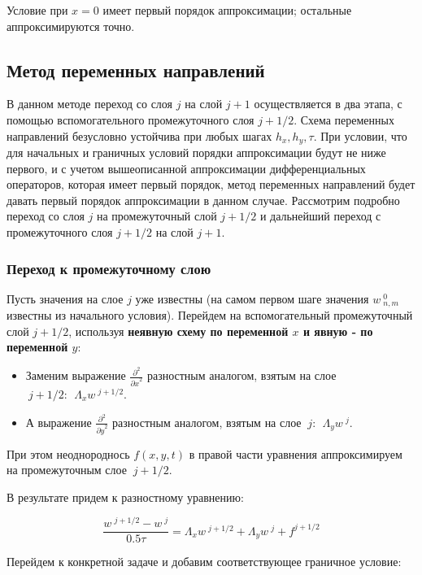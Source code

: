 \documentclass[a4paper]{article}
\begin{document}
Условие при $ x=0 $ имеет первый порядок аппроксимации; остальные аппроксимируются точно.

\subsection{Метод переменных направлений}
В данном методе переход со слоя $j$ на слой $j+1$ осуществляется в два этапа, с помощью вспомогательного промежуточного слоя $j+1/2$. Схема переменных направлений безусловно устойчива при любых шагах $h_x, h_y, \tau$. При условии, что для начальных и граничных условий порядки аппроксимации будут не ниже первого, и с учетом вышеописанной аппроксимации дифференциальных операторов, которая имеет первый порядок, метод переменных направлений будет давать первый порядок аппроксимации в данном случае. Рассмотрим подробно переход со слоя $j$ на промежуточный слой $j+1/2$ и дальнейший переход с промежуточного слоя $j+1/2$ на слой $j+1$.

\subsubsection{Переход к промежуточному слою}
Пусть значения на слое $j$ уже известны (на самом первом шаге значения $w~^{0}_{n,m}$ известны из начального условия). Перейдем на вспомогательный промежуточный слой $j + 1/2$, используя \textbf{неявную схему по переменной $x$ и явную - по переменной $y$}:

\begin{itemize}
\item Заменим выражение $\frac{\partial^2 }{{\partial x}^2}$ разностным аналогом, взятым на слое $~j+1/2: ~~\Lambda _x w~^{j + 1/2}$.

\item А выражение $\frac{\partial^2 }{{\partial y}^2}$ разностным аналогом, взятым на слое $~j:~~\Lambda _y w~^j$. 
\end{itemize}

При этом неоднороднось $f(x,y,t)$ в правой части уравнения аппроксимируем на промежуточным слое $~j+1/2$. 

В результате придем к разностному уравнению: 

\begin{equation}
\frac{w~^{j+1/2}-w~^j}{0.5 \tau} = \Lambda _x w~^{j+1/2} + \Lambda _y w~^{j} + f^{j+1/2}
\end{equation}

Перейдем к конкретной задаче и добавим соответствующее граничное условие:
\end{document}
